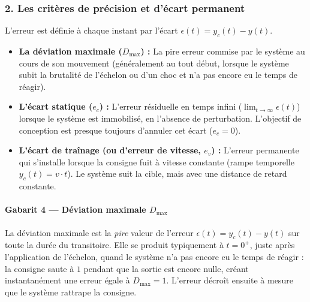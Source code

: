 \documentclass[11pt,a4paper]{report}
\begin{document}
\subsubsection{2. Les critères de précision et d'écart permanent}
L'erreur est définie à chaque instant par l'écart $\epsilon(t) = y_c(t) - y(t)$.
\begin{itemize}
    \item \textbf{La déviation maximale ($D_{\text{max}}$) :} La pire erreur commise par le système au cours de son mouvement (généralement au tout début, lorsque le système subit la brutalité de l'échelon ou d'un choc et n'a pas encore eu le temps de réagir).
    \item \textbf{L'écart statique ($e_c$) :} L'erreur résiduelle en temps infini ($\lim_{t\to\infty} \epsilon(t)$) lorsque le système est immobilisé, en l'absence de perturbation. L'objectif de conception est presque toujours d'annuler cet écart ($e_c = 0$).
    \item \textbf{L'écart de traînage (ou d'erreur de vitesse, $e_v$) :} L'erreur permanente qui s'installe lorsque la consigne fuit à vitesse constante (rampe temporelle $y_c(t) = v \cdot t$). Le système suit la cible, mais avec une distance de retard constante.
\end{itemize}


\paragraph{Gabarit 4 — Déviation maximale $D_{\max}$}

La déviation maximale est la \emph{pire} valeur de l'erreur $\epsilon(t) = y_c(t) - y(t)$ sur toute la durée du transitoire. Elle se produit typiquement à $t=0^+$, juste après l'application de l'échelon, quand le système n'a pas encore eu le temps de réagir : la consigne saute à $1$ pendant que la sortie est encore nulle, créant instantanément une erreur égale à $D_{\max} = 1$. L'erreur décroît ensuite à mesure que le système rattrape la consigne.
\end{document}
